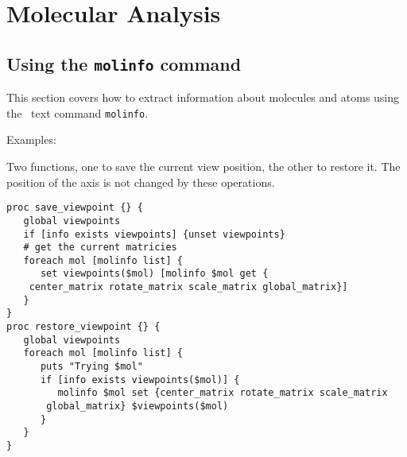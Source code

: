 
%
%
%

\chapter{Molecular Analysis}
\label{chapter:analysis}


\section{Using the {\tt molinfo} command}
This section covers how to extract information about molecules and
atoms using the \VMD\ text command {\tt molinfo}.

Examples:

Two functions, one to save the current view position, the other to
restore it.  The position of the axis is not changed by these
operations.

\begin{verbatim}
proc save_viewpoint {} {
   global viewpoints
   if [info exists viewpoints] {unset viewpoints}
   # get the current matricies
   foreach mol [molinfo list] {
      set viewpoints($mol) [molinfo $mol get {
	center_matrix rotate_matrix scale_matrix global_matrix}]
   }
}
proc restore_viewpoint {} {
   global viewpoints
   foreach mol [molinfo list] {
      puts "Trying $mol"
      if [info exists viewpoints($mol)] {
         molinfo $mol set {center_matrix rotate_matrix scale_matrix
	   global_matrix} $viewpoints($mol)
      }
   }
}
\end{verbatim}

